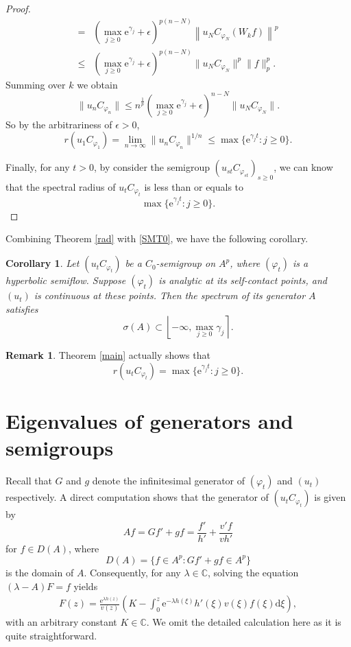 \documentclass{amsart}
\theoremstyle{proclaim}
\newtheorem{corollary}[theorem]{Corollary}
\theoremstyle{fancyproclaim}
\theoremstyle{definition}
\newtheorem{remark}[theorem]{Remark}
\theoremstyle{fancystatement}
\numberwithin{equation}{section}
\begin{document}
\begin{proof}
\begin{align*}
=&\left(\max_{j\geq0} \mathrm{e}^{\gamma_j}+\epsilon\right)^{p(n-N)} \left\|u_NC_{\varphi_N}(W_kf)\right\|^p\\
\leq&\left(\max_{j\geq0} \mathrm{e}^{\gamma_j}+\epsilon\right)^{p(n-N)} \|u_NC_{\varphi_N}\|^p\|f\|_p^p.
\end{align*}
Summing over $k$ we obtain
$$\|u_nC_{\varphi_n}\|\leq n^{\frac{1}{p}} \left(\max_{j\geq0} \mathrm{e}^{\gamma_j}+\epsilon\right)^{n-N} \|u_NC_{\varphi_N}\|.$$
So by the arbitrariness of $\epsilon>0$, 
$$r(u_1C_{\varphi_1})=\lim_{n\to\infty}\|u_nC_{\varphi_n}\|^{1/n}\leq\max\bigl\{\mathrm{e}^{\gamma_j t} : j\geq0\bigr\}.$$

Finally, for any $t>0$, by consider the semigroup $(u_{st}C_{\varphi_{st}})_{s\geq0}$, we can know that the spectral radius of $u_tC_{\varphi_t}$ is less than or equals to  $$\max\bigl\{\mathrm{e}^{\gamma_j t} : j\geq0\bigr\}.$$
\end{proof}

Combining Theorem \ref{rad} with \eqref{SMT0}, we have the following corollary.

\begin{corollary}\label{spectralbound}
Let $(u_tC_{\varphi_t})$ be a $C_0$-semigroup on $A^p$, where $(\varphi_t)$ is a hyperbolic semiflow. Suppose $(\varphi_t)$ is analytic at its self-contact points, and $(u_t)$ is continuous at these points. Then the spectrum of its generator $A$ satisfies
$$\sigma(A)\subset\left\lfloor-\infty, \max_{j\geq 0}\gamma_j\right\rceil.$$
\end{corollary}

\begin{remark}
Theorem \ref{main} actually shows that  $$r(u_tC_{\varphi_t})=\max\bigl\{\mathrm{e}^{\gamma_j t} : j\geq0\bigr\}.$$
\end{remark}

















\section{Eigenvalues of generators and semigroups}\label{sec5}

Recall that $G$ and $g$ denote the  infinitesimal generator of $(\varphi_t)$ and $(u_t)$ respectively. A direct computation shows that the generator of $(u_tC_{\varphi_t})$ is given by
$$Af=G f'+gf=\frac{f'}{h'}+\frac{v'f}{vh'}$$
for $f\in D(A)$, where
$$D(A)=\{f\in A^p : G f'+gf\in A^p\}$$
is the domain of $A$. Consequently, for any $\lambda\in\mathbb{C}$, solving the equation $(\lambda-A)F=f$ yields
\begin{align}\label{difsolu}
F(z)=\frac{ \mathrm{e}^{\lambda h(z)}}{v(z)}\left(K-\int_0^z \mathrm{e}^{-\lambda h(\xi)}h'(\xi)v(\xi)f(\xi) \mathrm{d}\xi\right),
\end{align}
with an arbitrary constant $K\in\mathbb{C}$. We omit the detailed calculation here as it is quite straightforward.
\end{document}

